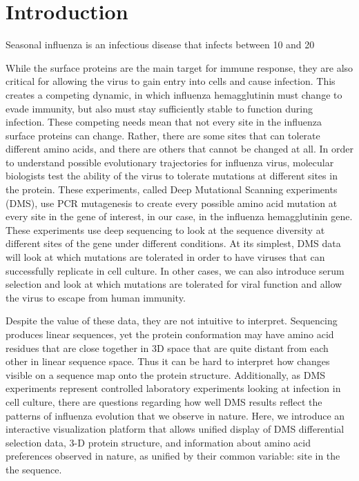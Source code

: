 \documentclass[sigchi]{acmart}
\begin{document}
\section{Introduction}

Seasonal influenza is an infectious disease that infects between 10 and 20%

While the surface proteins are the main target for immune response, they are also critical for allowing the virus to gain entry into cells and cause infection. This creates a competing dynamic, in which influenza hemagglutinin must change to evade immunity, but also must stay sufficiently stable to function during infection. These competing needs mean that not every site in the influenza surface proteins can change. Rather, there are some sites that can tolerate different amino acids, and there are others that cannot be changed at all. In order to understand possible evolutionary trajectories for influenza virus, molecular biologists test the ability of the virus to tolerate mutations at different sites in the protein. These experiments, called Deep Mutational Scanning experiments (DMS), use PCR mutagenesis to create every possible amino acid mutation at every site in the gene of interest, in our case, in the influenza hemagglutinin gene. These experiments use deep sequencing to look at the sequence diversity at different sites of the gene under different conditions. At its simplest, DMS data will look at which mutations are tolerated in order to have viruses that can successfully replicate in cell culture. In other cases, we can also introduce serum selection and look at which mutations are tolerated for viral function and allow the virus to escape from human immunity.

Despite the value of these data, they are not intuitive to interpret. Sequencing produces linear sequences, yet the protein conformation may have amino acid residues that are close together in 3D space that are quite distant from each other in linear sequence space. Thus it can be hard to interpret how changes visible on a sequence map onto the protein structure. Additionally, as DMS experiments represent controlled laboratory experiments looking at infection in cell culture, there are questions regarding how well DMS results reflect the patterns of influenza evolution that we observe in nature. Here, we introduce an interactive visualization platform that allows unified display of DMS differential selection data, 3-D protein structure, and information about amino acid preferences observed in nature, as unified by their common variable: site in the the sequence.
\end{document}

